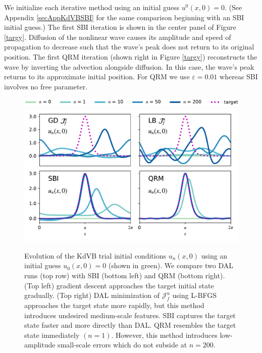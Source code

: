 \documentclass[%
 reprint,
 amsmath,amssymb,
 aps,
 pre,
]{revtex4-2}
\newcommand{\Juf}{\mathcal{J}^{u}_f}
\begin{document}
We initialize each iterative method using an initial guess $u^0(x,0)=0$.
(See Appendix \ref{secAppKdVBSBI} for the same comparison beginning with an SBI initial guess.)
The first SBI iteration is shown in the center panel of Figure \ref{targy}.
Diffusion of the nonlinear wave causes its amplitude and speed of propagation to decrease such that the wave's peak does not return to its original position.
The first QRM iteration (shown right in Figure \ref{targy}) reconstructs the wave by inverting the advection alongside diffusion.
In this case, the wave's peak returns to its approximate initial position.
For QRM we use $\varepsilon=0.01$ whereas SBI involves no free parameter.
\begin{figure}
  \centering
  \includegraphics[width=5.0in]{legend_kdvb.pdf}
  \includegraphics[width=5.0in]{PLTD/all.pdf}
  \caption{Evolution of the KdVB trial initial conditions $u_n(x,0)$ using an initial guess $u_0(x,0)=0$ (shown in green).
  We compare two DAL runs (top row) with SBI (bottom left) and QRM (bottom right).
  (Top left) gradient descent approaches the target initial state gradually.
  (Top right) DAL minimization of $\Juf$ using L-BFGS approaches the target state more rapidly, but this method introduces undesired medium-scale features.
  SBI captures the target state faster and more directly than DAL.
  QRM resembles the target state immediately $(n=1)$. 
  However, this method introduces low-amplitude small-scale errors which do not subside at $n=200$.
  }
  \label{kdvevo}
\end{figure}
\end{document}
